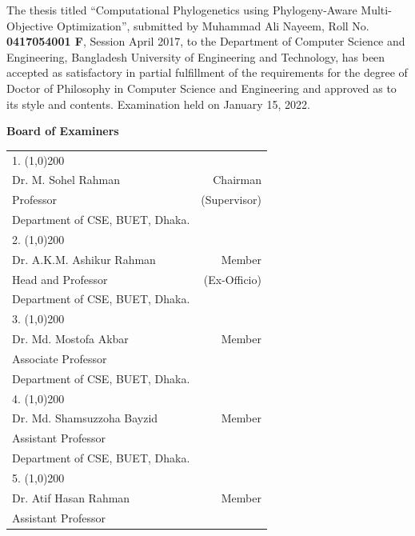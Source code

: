 \begin{singlespace}
\small{
 The thesis titled ``Computational Phylogenetics using Phylogeny-Aware Multi-Objective Optimization'', submitted by Muhammad Ali Nayeem, Roll No.
 \textbf{0417054001 F}, Session April 2017, to the Department of Computer Science
 and Engineering, Bangladesh University of Engineering and Technology, has been accepted as satisfactory 
 in partial fulfillment of the requirements for the degree of Doctor of Philosophy in Computer Science and Engineering and approved as to its style and contents. Examination held on January 15, 2022. \\ 
 
 \begin{spacing}{0.5}	
 \begin{center}
 	\textbf{\Large Board of Examiners}
 \end{center}
 \begin{tabular}{p{12cm} r }
 	\vspace{0.2cm}
 	1. \line(1,0){200} &  \\
 	Dr. M. Sohel Rahman & Chairman\\ 
 	Professor & (Supervisor)\\
 	Department of CSE, BUET, Dhaka.  & \\
 	\vspace{0.3cm}
 	2. \line(1,0){200} &  \\
 	Dr. A.K.M. Ashikur Rahman & Member\\ 
 	Head and Professor & (Ex-Officio)\\
  	Department of CSE, BUET, Dhaka.  & \\
 	\vspace{0.3cm}
 	3. \line(1,0){200} &  \\
 	Dr. Md. Mostofa Akbar & Member\\ 
 	Associate Professor & \\
 	Department of CSE, BUET, Dhaka.  & \\
 	\vspace{0.3cm}
 	4. \line(1,0){200} &  \\
 	Dr. Md. Shamsuzzoha Bayzid  & Member\\ 
 	Assistant Professor & \\
 	Department of CSE, BUET, Dhaka.  & \\
 	\vspace{0.3cm}
 	5. \line(1,0){200} &  \\
 	Dr. Atif Hasan Rahman  & Member\\ 
 	Assistant Professor & \\

\end{tabular}
\end{spacing}}
\end{singlespace}
